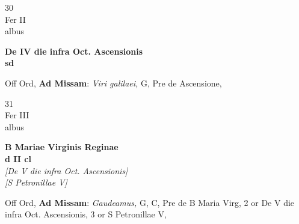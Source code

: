 \documentclass[10pt, openany]{book}
\begin{document}
        \begin{center}
            \begin{minipage}{3.5in}
                \vspace{2em}
                \begin{minipage}{0.5in}
                    {\Huge 30} \\
                    {\normalsize Fer II} \\
                    {\normalsize albus}
                \end{minipage}
                \begin{minipage}{3.0in}
                    \textbf{ \large De IV die infra Oct. Ascensionis \\
                    \textnormal{\normalsize sd}} \\ 
                \end{minipage}
                \begin{justify}Off Ord, \textbf{Ad Missam}: \textit{Viri galilaei,} G, Pre de Ascensione,  
                \end{justify}
            \end{minipage}
        \end{center}
    
        \begin{center}
            \begin{minipage}{3.5in}
                \vspace{2em}
                \begin{minipage}{0.5in}
                    {\Huge 31} \\
                    {\normalsize Fer III} \\
                    {\normalsize albus}
                \end{minipage}
                \begin{minipage}{3.0in}
                    \textbf{ \large B Mariae Virginis Reginae \\
                    \textnormal{\normalsize d II cl}} \\ \textit{[De V die infra Oct. Ascensionis]} \\ \textit{[S Petronillae V]} \\ 
                \end{minipage}
                \begin{justify}Off Ord, \textbf{Ad Missam}: \textit{Gaudeamus,} G, C, Pre de B Maria Virg, 2 or De V die infra Oct. Ascensionis, 3 or S Petronillae V,  
                \end{justify}
            \end{minipage}
        \end{center}
    
\end{document}
